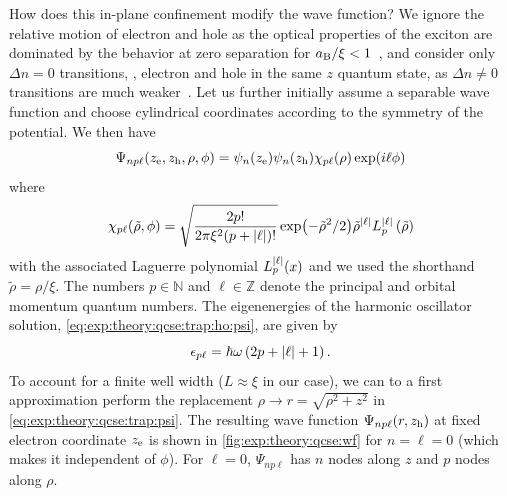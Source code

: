 How does this in-plane confinement modify the wave function?
We ignore the relative motion of electron and hole as the optical properties of the exciton are dominated by the behavior at zero separation for $a_{\mathrm{B}}/\xi < 1$~\cite{Kavokin1994}, and consider only $\Delta n = 0$ transitions, \ie, electron and hole in the same $z$ quantum state, as $\Delta n\neq 0$ transitions are much weaker~\cite{Davies2009}.
Let us further initially assume a separable wave function and choose cylindrical coordinates according to the symmetry of the potential.
We then have
\begin{equation}\label{eq:exp:theory:qcse:trap:psi}
    \Psi_{np\ell}(z_{\mathrm{e}}, z_{\mathrm{h}}, \rho, \phi) = \psi_n(z_{\mathrm{e}})\psi_n(z_{\mathrm{h}})\chi_{p\ell}(\rho)\exp(i\ell\phi)
\end{equation}
where~\cite{Karimi2014}
\begin{equation}\label{eq:exp:theory:qcse:trap:ho:psi}
    \chi_{p\ell}(\tilde{\rho}, \phi) = \sqrt{\frac{2p!}{2\pi\xi^2(p + \abs{\ell})!}}\exp(-\tilde{\rho}^2/2)\tilde{\rho}^{\abs{\ell}}L_p^{\abs{\ell}}\left(\tilde{\rho}\right)
\end{equation}
with the associated Laguerre polynomial $L_p^{\abs{\ell}}(x)$ and we used the shorthand $\tilde{\rho} = \rho/\xi$.
The numbers $p\in\mathbb{N}$ and $\ell\in\mathbb{Z}$ denote the principal and orbital momentum quantum numbers.
The eigenenergies of the harmonic oscillator solution, \cref{eq:exp:theory:qcse:trap:ho:psi}, are given by
\begin{equation}\label{eq:exp:theory:qcse:trap:ho:eps}
    \epsilon_{p\ell} = \hbar\omega\left(2p + \abs{\ell} + 1\right).
\end{equation}
To account for a finite well width ($L\approx\xi$ in our case), we can to a first approximation perform the replacement $\rho\to r = \sqrt{\rho^2 + z^2}$ in \cref{eq:exp:theory:qcse:trap:psi}.
The resulting wave function $\Psi_{np\ell}(r, z_{\mathrm{h}})$ at fixed electron coordinate $z_{\mathrm{e}}$ is shown in \cref{fig:exp:theory:qcse:wf} for $n = \ell = 0$ (which makes it independent of $\phi$).
For $\ell=0$, $\Psi_{np\ell}$ has $n$ nodes along $z$ and $p$ nodes along $\rho$.

